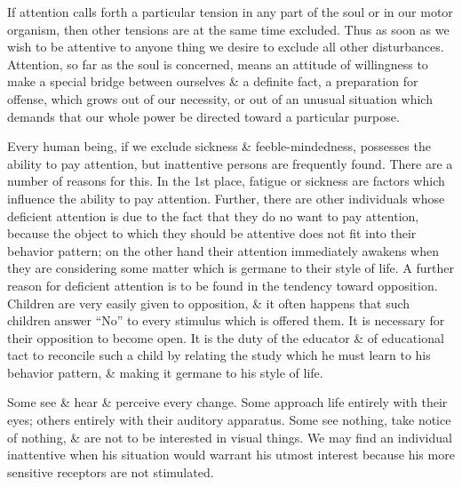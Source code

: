 \documentclass{article}
\begin{document}
If attention calls forth a particular tension in any part of the soul or in our motor organism, then other tensions are at the same time excluded. Thus as soon as we wish to be attentive to anyone thing we desire to exclude all other disturbances. Attention, so far as the soul is concerned, means an attitude of willingness to make a special bridge between ourselves \& a definite fact, a preparation for offense, which grows out of our necessity, or out of an unusual situation which demands that our whole power be directed toward a particular purpose.

Every human being, if we exclude sickness \& feeble-mindedness, possesses the ability to pay attention, but inattentive persons are frequently found. There are a number of reasons for this. In the 1st place, fatigue or sickness are factors which influence the ability to pay attention. Further, there are other individuals whose deficient attention is due to the fact that they do no want to pay attention, because the object to which they should be attentive does not fit into their behavior pattern; on the other hand their attention immediately awakens when they are considering some matter which is germane to their style of life. A further reason for deficient attention is to be found in the tendency toward opposition. Children are very easily given to opposition, \& it often happens that such children answer ``No'' to every stimulus which is offered them. It is necessary for their opposition to become open. It is the duty of the educator \& of educational tact to reconcile such a child by relating the study which he must learn to his behavior pattern, \& making it germane to his style of life.

Some see \& hear \& perceive every change. Some approach life entirely with their eyes; others entirely with their auditory apparatus. Some see nothing, take notice of nothing, \& are not to be interested in visual things. We may find an individual inattentive when his situation would warrant his utmost interest because his more sensitive receptors are not stimulated.
\end{document}
